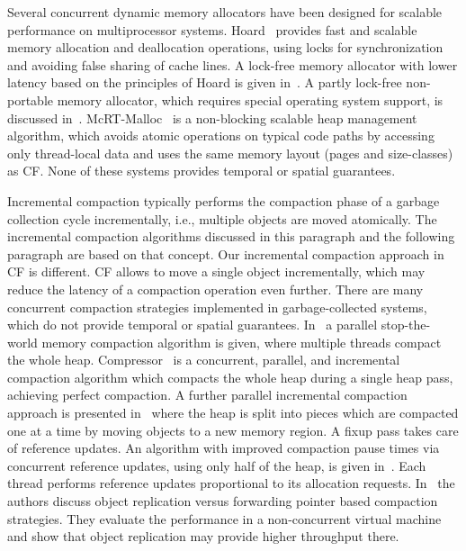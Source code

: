 \documentclass{amsart}
\begin{document}
Several concurrent dynamic memory allocators have been designed for
scalable performance on multiprocessor systems. Hoard~\cite{Ber1}
provides fast and scalable memory allocation and deallocation
operations, using locks for synchronization and avoiding false sharing
of cache lines. A lock-free memory allocator with lower latency based
on the principles of Hoard is given in~\cite{Mic1}. A partly lock-free
non-portable memory allocator, which requires special operating system
support, is discussed in~\cite{Dic1}. McRT-Malloc~\cite{Hud2} is a
non-blocking scalable heap management algorithm, which avoids atomic
operations on typical code paths by accessing only thread-local data
and uses the same memory layout (pages and size-classes) as CF. None
of these systems provides temporal or spatial guarantees.

Incremental compaction typically performs the compaction phase of a garbage
collection cycle incrementally, i.e., multiple objects are moved atomically.
The incremental compaction algorithms discussed in this paragraph and the
following paragraph are based on that concept. Our incremental compaction
approach in CF is different. CF allows to move a single object incrementally,
which may reduce the latency of a compaction operation even further.  There are
many concurrent compaction strategies implemented in garbage-collected systems,
which do not provide temporal or spatial guarantees.  In~\cite{Flo1} a parallel
stop-the-world memory compaction algorithm is given, where multiple threads
compact the whole heap.  Compressor~\cite{Ker1} is a concurrent, parallel, and
incremental compaction algorithm which compacts the whole heap during a single
heap pass, achieving perfect compaction. A further parallel incremental
compaction approach is presented in~\cite{Ben1} where the heap is split into
pieces which are compacted one at a time by moving objects to a new memory
region. A fixup pass takes care of reference updates.  An algorithm with improved
compaction pause times via concurrent reference updates, using only half of the
heap, is given in~\cite{Oss1}. Each thread performs reference updates
proportional to its allocation requests. In~\cite{Kalibera09} the authors discuss
object replication versus forwarding pointer based compaction strategies. They
evaluate the performance in a non-concurrent virtual machine and show that
object replication may provide higher throughput there.
\end{document}
